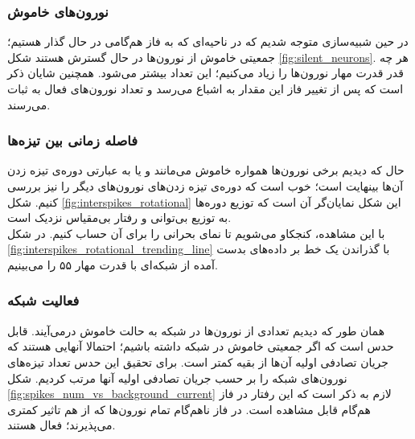 \documentclass[12pt,onecolumn,a4paper]{article}
\begin{document}
\subsubsection{نورون‌های خاموش}
در حین شبیه‌سازی متوجه شدیم که در ناحیه‌ای که به فاز هم‌گامی در حال گذار هستیم؛ جمعیتی خاموش از نورون‌ها در حال گسترش هستند شکل \ref{fig:silent_neurons}. هر چه قدر قدرت مهار نورون‌ها را زیاد می‌کنیم؛ این تعداد بیشتر می‌شود. همچنین شایان ذکر است که پس از تغییر فاز این مقدار به اشباع می‌رسد و تعداد نورون‌های فعال به ثبات می‌رسند.

\subsubsection{فاصله زمانی بین تیزه‌ها}
حال که دیدیم برخی نورون‌ها همواره خاموش می‌مانند و یا به عبارتی دوره‌ی تیزه زدن آن‌ها بینهایت است؛ خوب است که دوره‌ی تیزه زدن‌های نورون‌های دیگر را نیز بررسی کنیم. شکل \ref{fig:interspikes_rotational} این شکل نمایان‌گر آن است که توزیع دوره‌ها به توزیع بی‌توانی و رفتار بی‌مقیاس نزدیک است.\\
با این مشاهده، کنجکاو می‌شویم تا نمای بحرانی را برای آن حساب کنیم. در شکل \ref{fig:interspikes_rotational_trending_line} با گذراندن یک خط بر داده‌های بدست آمده از شبکه‌ای با قدرت مهار ۵۵ را می‌بینیم.

%


\subsubsection{فعالیت شبکه}
همان طور که دیدیم تعدادی از نورون‌ها در شبکه به حالت خاموش درمی‌آیند. قابل حدس است که اگر جمعیتی خاموش در شبکه داشته باشیم؛ احتمالا آنهایی هستند که جریان تصادفی اولیه آن‌ها از بقیه کمتر است. برای تحقیق این حدس تعداد تیزه‌های نورون‌های شبکه را بر حسب جریان تصادفی اولیه آنها مرتب کردیم. شکل \ref{fig:spikes_num_vs_background_current} لازم به ذکر است که این رفتار در فاز هم‌گام قابل مشاهده است. در فاز ناهم‌گام تمام نورون‌ها که از هم تاثیر کمتری می‌پذیرند؛ فعال هستند.
\end{document}
